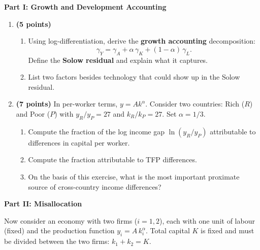 \documentclass[a4paper,11pt]{article}
\begin{document}
\textbf{Part I: Growth and Development Accounting}

\begin{enumerate}[label=\textbf{\arabic*.}, leftmargin=*, itemsep=6pt]

    \item \textbf{(5 points)}
    \begin{enumerate}[label=(\alph*), itemsep=4pt]
        \item Using log-differentiation, derive the \textbf{growth accounting}
        decomposition:
        \[
            \gamma_Y = \gamma_A + \alpha\,\gamma_K + (1-\alpha)\,\gamma_L.
        \]
        Define the \textbf{Solow residual} and explain what it captures.
        \item List two factors besides technology that could show up in the Solow residual.
    \end{enumerate}

    \item \textbf{(7 points)}
    In per-worker terms, $y = Ak^{\alpha}$.  Consider two countries: Rich ($R$) and
    Poor ($P$) with $y_R/y_P = 27$ and $k_R/k_P = 27$.  Set $\alpha = 1/3$.
    \begin{enumerate}[label=(\alph*), itemsep=4pt]
        \item Compute the fraction of the log income gap $\ln(y_R/y_P)$ attributable to
        differences in capital per worker.
        \item Compute the fraction attributable to TFP differences.
        \item On the basis of this exercise, what is the most important proximate source
        of cross-country income differences?
    \end{enumerate}

\end{enumerate}

\bigskip

\textbf{Part II: Misallocation}

\medskip
\noindent Now consider an economy with two firms ($i=1,2$), each with one unit of labour
(fixed) and the production function $y_i = A\,k_i^{\alpha}$.  Total capital $K$ is fixed
and must be divided between the two firms: $k_1 + k_2 = K$.
\end{document}
